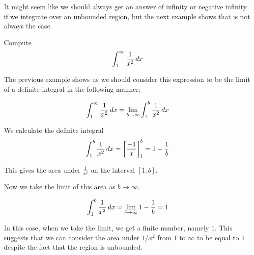 \documentclass{ximera}
\begin{document}
It might seem like we should always get an answer of infinity or negative infinity if we integrate over an unbounded region, but the next example shows that is not always the case.

\begin{example}
Compute
\[
\int_{1}^{\infty} \frac{1}{x^2} \mathop{}\!d x
\]

\begin{explanation}
The previous example shows us we should consider this expression to be the limit of a definite integral
in the following manner:

\[
\int_{1}^{\infty} \frac{1}{x^2} \mathop{}\!d x=\lim_{b \to \infty} \int_{1}^{b} \frac{1}{x^2} \mathop{}\!d x
\]

We calculate the definite integral
\[
\int_{1}^{b} \frac{1}{x^2} \mathop{}\!d x= \bigg[ \frac{-1}{x} \bigg]_{1}^{b}=1-\frac{1}{b}
\]

This gives the area under $\frac{1}{x^2}$ on the interval $[1, b]$.

\begin{image}
\end{image}

Now we take the limit of this area as $b \to \infty$.

\[
\int_{1}^{b} \frac{1}{x^2} \mathop{}\!d x= \lim_{b \to \infty} 1-\frac{1}{b}=1
\]

In this case, when we take the limit, we get a finite number, namely $1$. This suggests that we can consider the
area under $1/x^2$ from $1$ to $\infty$ to be equal to $1$ despite the fact that the region is unbounded.



\end{explanation}
\end{example}
\end{document}
